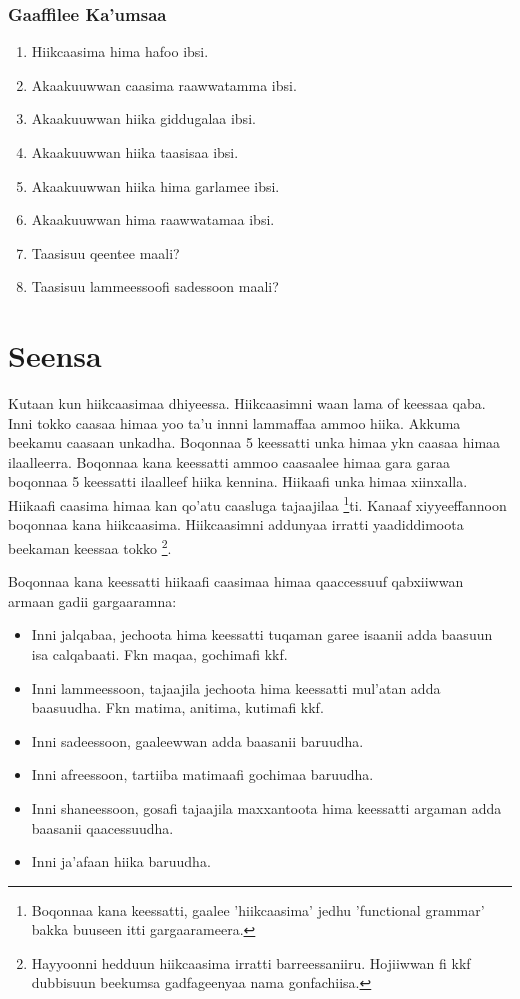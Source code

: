 \documentclass[11pt,b5paper]{book}
\begin{document}
\subsubsection{Gaaffilee Ka'umsaa}
\begin{enumerate}
	\item Hiikcaasima hima hafoo ibsi.
	\item Akaakuuwwan caasima raawwatamma ibsi.
	\item Akaakuuwwan hiika giddugalaa ibsi.
	\item Akaakuuwwan hiika taasisaa ibsi.
	\item Akaakuuwwan hiika hima garlamee ibsi.
	\item Akaakuuwwan hima raawwatamaa ibsi. 
	\item Taasisuu qeentee maali?
	\item Taasisuu lammeessoofi sadessoon maali?
\end{enumerate}


\section{Seensa}
Kutaan kun hiikcaasimaa dhiyeessa. Hiikcaasimni waan lama of keessaa qaba. Inni tokko caasaa himaa yoo ta'u innni lammaffaa ammoo hiika. Akkuma beekamu caasaan unkadha. Boqonnaa 5 keessatti unka himaa ykn caasaa himaa ilaalleerra. Boqonnaa kana keessatti ammoo caasaalee himaa gara garaa boqonnaa 5 keessatti ilaalleef hiika kennina. Hiikaafi unka himaa xiinxalla. Hiikaafi caasima himaa kan qo'atu caasluga tajaajilaa \footnote{Boqonnaa kana keessatti, gaalee 'hiikcaasima' jedhu 'functional grammar' bakka buuseen itti gargaarameera.}ti. Kanaaf xiyyeeffannoon boqonnaa kana hiikcaasima. Hiikcaasimni addunyaa irratti yaadiddimoota beekaman keessaa tokko \footnote{Hayyoonni hedduun hiikcaasima irratti barreessaniiru. Hojiiwwan \cite{siewierska1984passive,shibatani1985passives,halliday1994introduction,kulikov1993second,mous2001middle,tolemariam2009} fi kkf dubbisuun beekumsa gadfageenyaa nama gonfachiisa.}. 

Boqonnaa kana keessatti hiikaafi caasimaa himaa qaaccessuuf qabxiiwwan armaan gadii gargaaramna:\\
\begin{itemize}
	\item Inni jalqabaa, jechoota hima keessatti tuqaman garee isaanii adda baasuun isa calqabaati. Fkn maqaa, gochimafi kkf. 
	\item Inni lammeessoon, tajaajila jechoota hima keessatti mul’atan adda baasuudha. Fkn matima, anitima, kutimafi kkf.
	\item Inni sadeessoon, gaaleewwan adda baasanii baruudha. 
	\item Inni afreessoon, tartiiba matimaafi gochimaa baruudha.
	\item Inni shaneessoon, gosafi tajaajila maxxantoota hima keessatti argaman adda baasanii qaacessuudha.
	\item Inni ja'afaan hiika baruudha.
	
\end{itemize}
\end{document}
